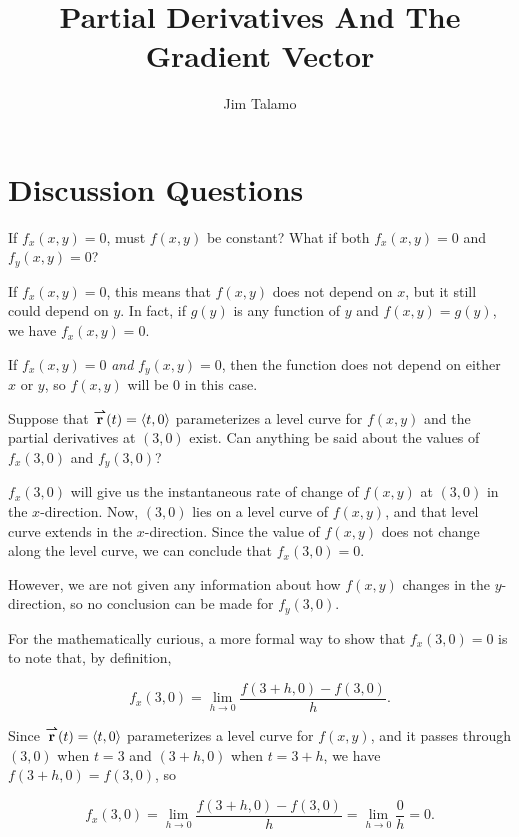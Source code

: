 \documentclass[noauthor,handout]{ximera}
\author{Jim Talamo}
\title[Collaborate:]{Partial Derivatives And The Gradient Vector}
\begin{document}
\begin{abstract}
\end{abstract}
\maketitle

\section{Discussion Questions}



\begin{problem}
If $f_x(x,y) = 0$, must $f(x,y)$ be constant?  What if both $f_x(x,y) = 0$ and $f_y(x,y)=0$?

\begin{freeResponse}
If $f_x(x,y) = 0$, this means that $f(x,y)$ does not depend on $x$, but it still could depend on $y$.  In fact, if $g(y)$ is any function of $y$ and $f(x,y)=g(y)$, we have $f_x(x,y)=0$.

If $f_x(x,y)=0$ \emph{and} $f_y(x,y)=0$, then the function does not depend on either $x$ or $y$, so $f(x,y)$ will be $0$ in this case.
\end{freeResponse}

\end{problem}


\begin{problem}
Suppose that ${\overset{\boldsymbol{\rightharpoonup}}{\mathbf{r}}}(t) = \left\langle t,0\right\rangle$ parameterizes a level curve for $f(x,y)$ and the partial derivatives at $(3,0)$ exist.  Can anything be said about the values of $f_x(3,0)$ and $f_y(3,0)$?

\begin{freeResponse}
$f_x(3,0)$ will give us the instantaneous rate of change of $f(x,y)$ at $(3,0)$ in the $x$-direction.  Now, $(3,0)$ lies on a level curve of $f(x,y)$, and that level curve extends in the $x$-direction.  Since the value of $f(x,y)$ does not change along the level curve, we can conclude that $f_x(3,0)=0$.  

However, we are not given any information about how $f(x,y)$ changes in the $y$-direction, so no conclusion can be made for $f_y(3,0)$.

\begin{remark}
For the mathematically curious, a more formal way to show that $f_x(3,0)=0$ is to note that, by definition, 

\[
f_x(3,0) = \lim_{h \to 0} \frac{f(3+h,0)-f(3,0)}{h}.
\]

Since ${\overset{\boldsymbol{\rightharpoonup}}{\mathbf{r}}}(t) = \left\langle t,0\right\rangle$ parameterizes a level curve for $f(x,y)$, and it passes through $(3,0)$ when $t=3$ and $(3+h,0)$ when $t=3+h$, we have $f(3+h,0)=f(3,0)$, so 

\[
f_x(3,0) = \lim_{h \to 0} \frac{f(3+h,0)-f(3,0)}{h}= \lim_{h \to 0} \frac{0}{h} =0 .
\]
\end{remark}
\end{freeResponse}
\end{problem}
\end{document}
